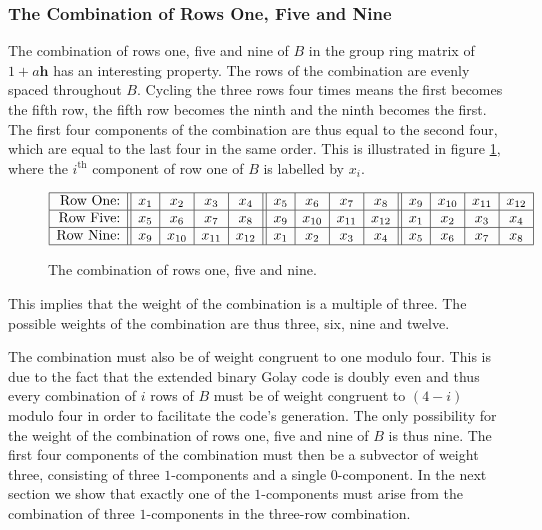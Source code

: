 \subsubsection{The Combination of Rows One, Five and Nine}
The combination of rows one, five and nine of $B$ in the group ring matrix of $1 + a \mathbf{h}$ has an interesting property.
The rows of the combination are evenly spaced throughout $B$.
Cycling the three rows four times means the first becomes the fifth row, the fifth row becomes the ninth and the ninth becomes the first.
The first four components of the combination are thus equal to the second four, which are equal to the last four in the same order.
This is illustrated in figure \ref{fig:rowsonefivenine}, where the $i^{\textrm{th}}$ component of row one of $B$ is labelled by $x_i$.
\begin{figure}
\begin{center}
$\begin{array}{|r||c|c|c|c||c|c|c|c||c|c|c|c|}
	\hline
	\textrm{Row One:}  & x_{ 1} & x_{ 2} & x_{ 3} & x_{ 4} & x_{ 5} & x_{ 6} & x_{ 7} & x_{ 8} & x_{ 9} & x_{10} & x_{11} & x_{12} \\
	\hline
	\textrm{Row Five:} & x_{ 5} & x_{ 6} & x_{ 7} & x_{ 8} & x_{ 9} & x_{10} & x_{11} & x_{12} & x_{ 1} & x_{ 2} & x_{ 3} & x_{ 4} \\
	\hline
	\textrm{Row Nine:} & x_{ 9} & x_{10} & x_{11} & x_{12} & x_{ 1} & x_{ 2} & x_{ 3} & x_{ 4} & x_{ 5} & x_{ 6} & x_{ 7} & x_{ 8} \\
	\hline
\end{array}$
\caption{The combination of rows one, five and nine.}
\label{fig:rowsonefivenine}
\end{center}
\end{figure}
This implies that the weight of the combination is a multiple of three.
The possible weights of the combination are thus three, six, nine and twelve.

The combination must also be of weight congruent to one modulo four.
This is due to the fact that the extended binary Golay code is doubly even and thus every combination of $i$ rows of $B$ must be of weight congruent to $(4-i)$ modulo four in order to facilitate the code's generation.
The only possibility for the weight of the combination of rows one, five and nine of $B$ is thus nine.
The first four components of the combination must then be a subvector of weight three, consisting of three $1$-components and a single $0$-component.
In the next section we show that exactly one of the $1$-components must arise from the combination of three $1$-components in the three-row combination.


